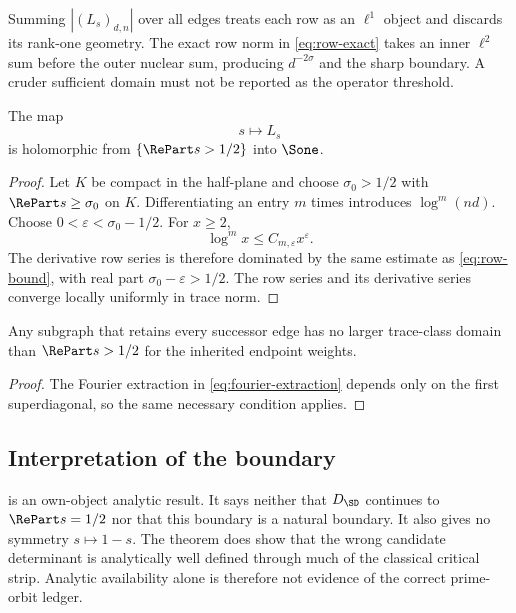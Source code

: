 \begin{remark}
Summing \(|(L_s)_{d,n}|\) over all edges treats each row as an \(\ell^1\)
object and discards its rank-one geometry.  The exact row norm in
\cref{eq:row-exact} takes an inner \(\ell^2\) sum before the outer nuclear
sum, producing \(d^{-2\sigma}\) and the sharp boundary.  A cruder sufficient
domain must not be reported as the operator threshold.
\end{remark}

\begin{proposition}
\label{prop:holomorphy}
The map
\[
 s\longmapsto L_s
\]
is holomorphic from \(\{\RePart s>1/2\}\) into \(\Sone\).
\end{proposition}

\begin{proof}
Let \(K\) be compact in the half-plane and choose
\(\sigma_0>1/2\) with \(\RePart s\ge\sigma_0\) on \(K\).  Differentiating an
entry \(m\) times introduces \(\log^m(nd)\).  Choose
\(0<\varepsilon<\sigma_0-1/2\).  For \(x\ge2\),
\[
 \log^m x\le C_{m,\varepsilon}x^\varepsilon.
\]
The derivative row series is therefore dominated by the same estimate as
\cref{eq:row-bound}, with real part
\(\sigma_0-\varepsilon>1/2\).  The row series and its derivative series
converge locally uniformly in trace norm.
\end{proof}

\begin{corollary}
\label{cor:successor-necessity}
Any subgraph that retains every successor edge has no larger trace-class
domain than \(\RePart s>1/2\) for the inherited endpoint weights.
\end{corollary}

\begin{proof}
The Fourier extraction in \cref{eq:fourier-extraction} depends only on the
first superdiagonal, so the same necessary condition applies.
\end{proof}

\subsection{Interpretation of the boundary}

 is an own-object analytic result.  It says neither that
\(D_{\SD}\) continues to \(\RePart s=1/2\) nor that this boundary is a
natural boundary.  It also gives no symmetry \(s\mapsto1-s\).  The theorem
does show that the wrong candidate determinant is analytically well defined
through much of the classical critical strip.  Analytic availability alone
is therefore not evidence of the correct prime-orbit ledger.
